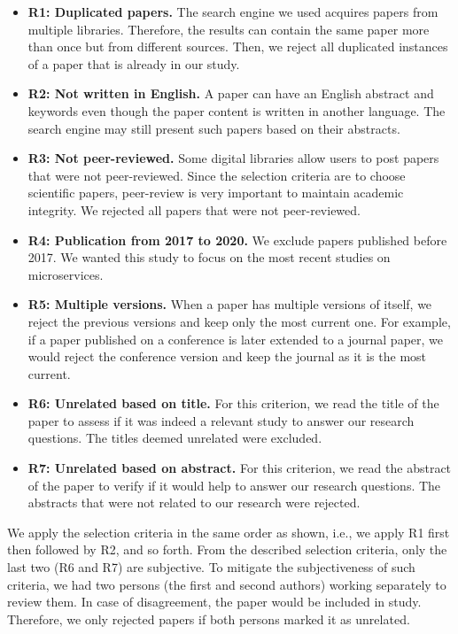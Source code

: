 \begin{itemize}
   \item \textbf{R1: Duplicated papers.} The search engine we used acquires papers from multiple libraries. Therefore, the results can contain the same paper more than once but from different sources. Then, we reject all duplicated instances of a paper that is already in our study.
   \item \textbf{R2: Not written in English.} A paper can have an English abstract and keywords even though the paper content is written in another language. The search engine may still present such papers based on their abstracts.
  \item \textbf{R3: Not peer-reviewed.} Some digital libraries allow users to post papers that were not peer-reviewed. Since the selection criteria are to choose scientific papers,  peer-review is very important to maintain academic integrity. We rejected all papers that were not peer-reviewed.
   \item \textbf{R4: Publication from 2017 to 2020.} 
We exclude papers published before 2017. We wanted this study to focus on the most recent studies on microservices.
  \item \textbf{R5: Multiple versions.} When a paper has multiple versions of itself, we reject the previous versions and keep only the most current one. For example, if a paper published on a conference is later extended to a journal paper, we would reject the conference version and keep the journal as it is the most current.
  \item \textbf{R6: Unrelated based on title.} For this criterion, we read the title of the paper to assess if it was indeed a relevant study to answer our research questions. The titles deemed unrelated were excluded.
  \item \textbf{R7: Unrelated based on abstract.} For this criterion, we read the abstract of the paper to verify if it would help to answer our research questions. The abstracts that were not related to our research were rejected.  
\end{itemize}


We apply the selection criteria in the same order as shown, i.e., we apply R1 first then followed by R2, and so forth.
From the described selection criteria, only the last two (R6 and R7) are subjective. To mitigate the subjectiveness of such criteria, we had two persons (the first and second authors) working separately to review them. In case of disagreement, the paper would be included in study. Therefore, we only rejected papers if both persons marked it as unrelated.


